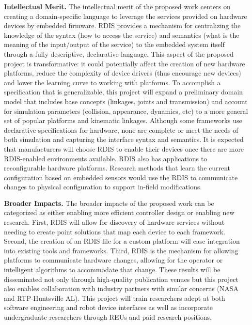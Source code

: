\textbf{Intellectual Merit.}
The intellectual merit of the proposed work centers on creating a domain-specific language to leverage the services provided on hardware devices by embedded firmware.  RDIS  provides a mechanism for centralizing the knowledge of the syntax (how to access the service) and semantics (what is the meaning of the input/output of the service) to the embedded system itself through a fully descriptive, declarative language.  This aspect of the proposed project is transformative: it could potentially affect the creation of new hardware platforms, reduce the complexity of device drivers (thus encourage new devices) and lower the learning curve to working with platforms.   To accomplish a specification that is generalizable, this project will expand a preliminary domain model that includes base concepts (linkages, joints and transmission) and account for simulation parameters (collision, appearance, dynamics, etc) to a more general set of popular platforms and kinematic linkages.  Although some frameworks use declarative specifications for hardware, none are complete or meet the needs of both simulation and capturing the interface syntax and semantics. It is expected that manufacturers will choose RDIS to enable their devices once there are more RDIS-enabled environments available.  RDIS also has applications to reconfigurable hardware platforms.  Research methods that learn the current configuration based on embedded sensors would use the RDIS to communicate changes to physical configuration to support in-field modifications.

\textbf{Broader Impacts.}
The broader impacts of the proposed work can be categorized as either enabling more efficient controller design or enabling new research.   First, RDIS will allow for discovery of hardware services without needing to create point solutions that map each device to each framework.  Second, the creation of an RDIS file for a custom platform will ease integration into existing tools and frameworks.  Third, RDIS is the mechanism for allowing platforms to communicate hardware changes, allowing for the operator or intelligent algorithms to accommodate that change.  These results will be disseminated not only through high-quality publication venues but this project also enables collaboration with industry partners with similar concerns (NASA and RTP-Huntsville AL).   This project will train researchers adept at both software engineering and robot device interfaces as well as incorporate undergraduate researchers through REUs and paid research positions.


